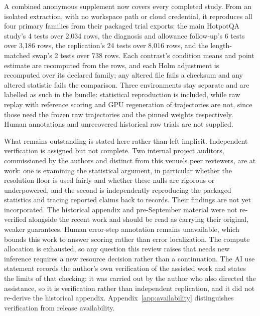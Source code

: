 \documentclass{article}
\begin{document}
A combined anonymous supplement now covers every completed study. From an
isolated extraction, with no workspace path or cloud credential, it
reproduces all four primary families from their packaged trial exports: the
main HotpotQA study's 4 tests over 2,034 rows, the diagnosis and allowance
follow-up's 6 tests over 3,186 rows, the replication's 24 tests over 8,016
rows, and the length-matched swap's 2 tests over 738 rows. Each contrast's
condition means and point estimate are recomputed from the rows, and each
Holm adjustment is recomputed over its declared family; any altered file
fails a checksum and any altered statistic fails the comparison. Three
environments stay separate and are labelled as such in the bundle:
statistical reproduction is included, while raw replay with reference
scoring and GPU regeneration of trajectories are not, since those need the
frozen raw trajectories and the pinned weights respectively. Human
annotations and unrecovered historical raw trials are not supplied.

What remains outstanding is stated here rather than left implicit. Independent
verification is assigned but not complete. Two internal project auditors,
commissioned by the authors and distinct from this venue's peer reviewers, are
at work: one is examining the statistical argument, in particular whether the
resolution floor is used fairly and whether these nulls are rigorous or
underpowered, and the second is independently reproducing the packaged
statistics and tracing reported claims back to records. Their findings are not
yet incorporated. The historical
appendix and pre-September material were not re-verified alongside the recent
work and should be read as carrying their original, weaker guarantees. Human
error-step annotation remains unavailable, which bounds this work to answer
scoring rather than error localization. The compute allocation is exhausted, so
any question this review raises that needs new inference requires a new
resource decision rather than a continuation. The AI use statement records the
author's own verification of the assisted work and states the limits of that
checking: it was carried out by the author who also directed the assistance,
so it is verification rather than independent replication, and it did not
re-derive the historical appendix.
Appendix~\ref{app:availability} distinguishes verification from release
availability.





\end{document}
